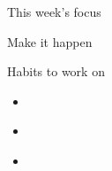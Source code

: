 \documentclass{article}
\newcommand{\mydots}{\textcolor{black!20!white}{\tiny\dotfill}}
\begin{document}
\begin{week}
\begin{minipage}{0.5\textwidth}
\vfill
    \begin{tcolorbox}%
        This week's focus
        \par\vspace{1in}\null
        \tcblower
        Make it happen
        \par\vspace{4.5in}\null
    \end{tcolorbox}
    \begin{tcolorbox}
        Habits to work on
        \begin{itemize}[leftmargin=*]
            \item \mydots \par \mydots \par \mydots
            \item \mydots \par \mydots \par \mydots
            \item \mydots \par \mydots \par \mydots
                \par \mydots
        \end{itemize}
    \end{tcolorbox}
\end{minipage}
\begin{minipage}{0.5\textwidth}
\vfill
    \setlength{\parindent}{0.5cm}
        \mydots\par\mydots\par\mydots\par
        \mydots\par\mydots\par\mydots\par
        \mydots\par\mydots\par\mydots\par
        \mydots\par\mydots\par\mydots\par
        \mydots\par\mydots\par\mydots\par
        \mydots\par\mydots\par\mydots\par

\end{minipage}
\end{week}
\end{document}
